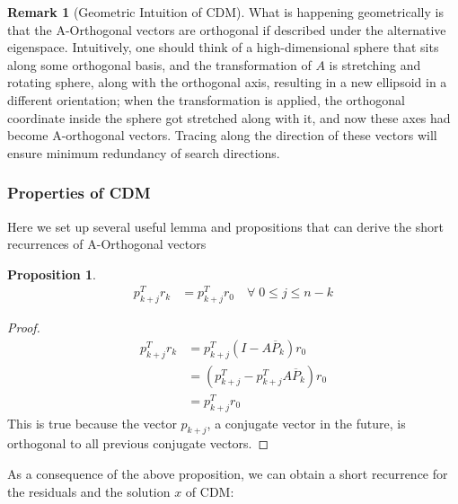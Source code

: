 \documentclass[]{article}
\theoremstyle{definition}
\newtheorem{prop}{Proposition}[section]  %
\newtheorem{remark}{Remark}[subsection]  %
\begin{document}
            \begin{remark}[Geometric Intuition of CDM]
                What is happening geometrically is that the A-Orthogonal vectors are orthogonal if described under the alternative eigenspace. Intuitively, one should think of a high-dimensional sphere that sits along some orthogonal basis, and the transformation of $A$ is stretching and rotating sphere, along with the orthogonal axis, resulting in a new ellipsoid in a different orientation; when the transformation is applied, the orthogonal coordinate inside the sphere got stretched along with it, and now these axes had become A-orthogonal vectors. Tracing along the direction of these vectors will ensure minimum redundancy of search directions. 
            \end{remark}
        \subsubsection{Properties of CDM}
            Here we set up several useful lemma and propositions that can derive the short recurrences of A-Orthogonal vectors 
            \begin{prop}
                \begin{align}
                    p_{k + j}^Tr_k &= p_{k + j}^Tr_0 \quad \forall \; 0 \le j \le n - k
                \end{align}
            \end{prop}
            \begin{proof}
                \begin{align}
                    p_{k + j}^Tr_k &= p_{k + j}^T(I - A\overline{P}_k)r_0
                    \\
                    &= (p^T_{k + j} - p^T_{k + j}A\overline{P}_k)r_0
                    \\
                    &= p_{k + j}^Tr_0    
                \end{align}
                This is true because the vector $p_{k + j}$, a conjugate vector in the future, is orthogonal to all previous conjugate vectors. 
            \end{proof}
            As a consequence of the above proposition, we can obtain a short recurrence for the residuals and the solution $x$ of CDM: 
\end{document}
